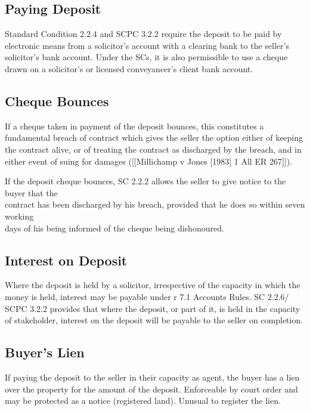 \documentclass[
]{article}
\begin{document}
\hypertarget{paying-deposit}{%
\subsection{Paying Deposit}\label{paying-deposit}}

Standard Condition 2.2.4 and SCPC 3.2.2 require the deposit to be paid
by electronic means from a solicitor's account with a clearing bank to
the seller's solicitor's bank account. Under the SCs, it is also
permissible to use a cheque drawn on a solicitor's or licensed
conveyancer's client bank account.

\hypertarget{cheque-bounces}{%
\subsection{Cheque Bounces}\label{cheque-bounces}}

If a cheque taken in payment of the deposit bounces, this constitutes a
fundamental breach of contract which gives the seller the option either
of keeping the contract alive, or of treating the contract as discharged
by the breach, and in either event of suing for damages
({[}{[}Millichamp v Jones {[}1983{]} 1 All ER 267{]}{]}).

If the deposit cheque bounces, SC 2.2.2 allows the seller to give notice
to the buyer that the\\
contract has been discharged by his breach, provided that he does so
within seven working\\
days of his being informed of the cheque being dishonoured.

\hypertarget{interest-on-deposit}{%
\subsection{Interest on Deposit}\label{interest-on-deposit}}

Where the deposit is held by a solicitor, irrespective of the capacity
in which the money is held, interest may be payable under r 7.1 Accounts
Rules. SC 2.2.6/ SCPC 3.2.2 provides that where the deposit, or part of
it, is held in the capacity of stakeholder, interest on the deposit will
be payable to the seller on completion.

\hypertarget{buyers-lien}{%
\subsection{Buyer's Lien}\label{buyers-lien}}

If paying the deposit to the seller in their capacity as agent, the
buyer has a lien over the property for the amount of the deposit.
Enforceable by court order and may be protected as a notice (registered
land). Unusual to register the lien.
\end{document}
